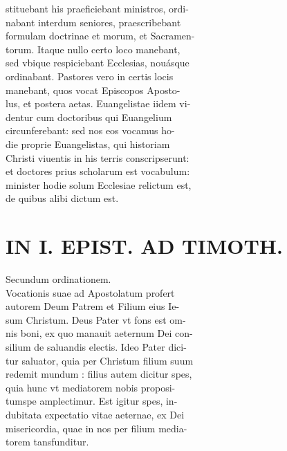 \documentclass{article}
\begin{document}
\begin{pages}
                stituebant his praeficiebant ministros, ordi- \\
                nabant interdum seniores, praescribebant \\
                formulam doctrinae et morum, et Sacramen- \\
                torum. Itaque nullo certo loco manebant, \\
                sed vbique respiciebant Ecclesias, nouásque \\
                ordinabant. Pastores vero in certis locis \\
                manebant, quos vocat Episcopos Aposto- \\
                lus, et postera aetas. Euangelistae iidem vi- \\
                dentur cum doctoribus qui Euangelium \\
                circunferebant: sed nos eos vocamus ho- \\
                die proprie Euangelistas, qui historiam \\
                Christi viuentis in his terris conscripserunt: \\
                et doctores prius scholarum est vocabulum: \\
                minister hodie solum Ecclesiae relictum est, \\
                de quibus alibi dictum est. \\
                
\section*{IN I. EPIST. AD TIMOTH. \\
                }Secundum ordinationem. \\
                Vocationis suae ad Apostolatum profert \\
                autorem Deum Patrem et Filium eius Ie- \\
                sum Christum. Deus Pater vt fons est om- \\
                nis boni, ex quo manauit aeternum Dei con- \\
                silium de saluandis electis. Ideo Pater dici- \\
                tur saluator, quia per Christum filium suum \\
                redemit mundum : filius autem dicitur spes, \\
                quia hunc vt mediatorem nobis proposi- \\
                tumspe amplectimur. Est igitur spes, in- \\
                dubitata expectatio vitae aeternae, ex Dei \\
                misericordia, quae in nos per filium media- \\
                torem tansfunditur. \\
                

\end{pages}
\end{document}
